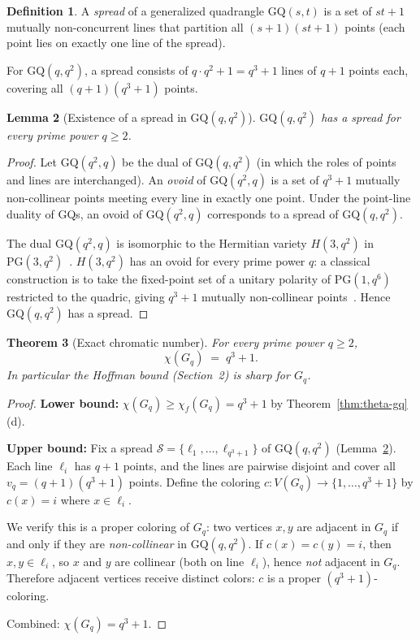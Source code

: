\documentclass{article}
\newtheorem{theorem}{Theorem}[section]
\newtheorem{lemma}[theorem]{Lemma}
\theoremstyle{definition}
\newtheorem{definition}[theorem]{Definition}
\begin{document}
\begin{definition}
A \emph{spread} of a generalized quadrangle $\mathrm{GQ}(s,t)$ is a set of $st+1$ mutually non-concurrent lines that partition all $(s+1)(st+1)$ points (each point lies on exactly one line of the spread).
\end{definition}

For $\mathrm{GQ}(q,q^2)$, a spread consists of $q\cdot q^2+1=q^3+1$ lines of $q+1$ points each, covering all $(q+1)(q^3+1)$ points.

\begin{lemma}[Existence of a spread in $\mathrm{GQ}(q,q^2)$]\label{lem:gq-spread}
$\mathrm{GQ}(q,q^2)$ has a spread for every prime power $q\ge 2$.
\end{lemma}

\begin{proof}
Let $\mathrm{GQ}(q^2,q)$ be the dual of $\mathrm{GQ}(q,q^2)$ (in which the roles of points and lines are interchanged).  An \emph{ovoid} of $\mathrm{GQ}(q^2,q)$ is a set of $q^3+1$ mutually non-collinear points meeting every line in exactly one point.  Under the point-line duality of GQs, an ovoid of $\mathrm{GQ}(q^2,q)$ corresponds to a spread of $\mathrm{GQ}(q,q^2)$.

The dual $\mathrm{GQ}(q^2,q)$ is isomorphic to the Hermitian variety $H(3,q^2)$ in $\mathrm{PG}(3,q^2)$~\cite{PT1984}.  $H(3,q^2)$ has an ovoid for every prime power $q$: a classical construction is to take the fixed-point set of a unitary polarity of $\mathrm{PG}(1,q^6)$ restricted to the quadric, giving $q^3+1$ mutually non-collinear points~\cite{PT1984}.  Hence $\mathrm{GQ}(q,q^2)$ has a spread.
\end{proof}

\begin{theorem}[Exact chromatic number]\label{thm:chi-exact}
For every prime power $q\ge 2$,
\[
  \chi(G_q) \;=\; q^3+1.
\]
In particular the Hoffman bound (Section~2) is sharp for $G_q$.
\end{theorem}

\begin{proof}
\textbf{Lower bound:} $\chi(G_q)\ge\chi_f(G_q)=q^3+1$ by Theorem~\ref{thm:theta-gq}(d).

\textbf{Upper bound:} Fix a spread $\mathcal{S}=\{\ell_1,\ldots,\ell_{q^3+1}\}$ of $\mathrm{GQ}(q,q^2)$ (Lemma~\ref{lem:gq-spread}).  Each line $\ell_i$ has $q+1$ points, and the lines are pairwise disjoint and cover all $v_q=(q+1)(q^3+1)$ points.  Define the coloring $c:V(G_q)\to\{1,\ldots,q^3+1\}$ by $c(x)=i$ where $x\in\ell_i$.

We verify this is a proper coloring of $G_q$: two vertices $x,y$ are adjacent in $G_q$ if and only if they are \emph{non-collinear} in $\mathrm{GQ}(q,q^2)$.  If $c(x)=c(y)=i$, then $x,y\in\ell_i$, so $x$ and $y$ are collinear (both on line $\ell_i$), hence \emph{not} adjacent in $G_q$.  Therefore adjacent vertices receive distinct colors: $c$ is a proper $(q^3+1)$-coloring.

Combined: $\chi(G_q)=q^3+1$.
\end{proof}
\end{document}

